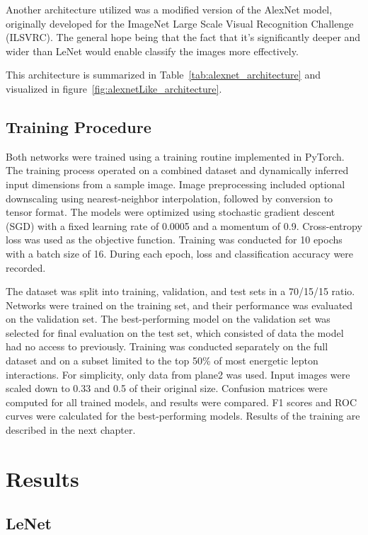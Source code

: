 \documentclass{pracalicmgr}
\begin{document}
Another architecture utilized was a modified version of the AlexNet model, originally developed for the ImageNet Large Scale Visual Recognition Challenge (ILSVRC). The general hope being that the fact that it's significantly deeper and wider than LeNet would enable classify the images more effectively\cite{AlexNETpub}.

This architecture is summarized in Table~\ref{tab:alexnet_architecture} and visualized in figure~\ref{fig:alexnetLike_architecture}.

\subsection{Training Procedure}

Both networks were trained using a training routine implemented in PyTorch. The training process operated on a combined dataset and dynamically inferred input dimensions from a sample image. Image preprocessing included optional downscaling using nearest-neighbor interpolation, followed by conversion to tensor format. The models were optimized using stochastic gradient descent (SGD) with a fixed learning rate of 0.0005 and a momentum of 0.9. Cross-entropy loss was used as the objective function. Training was conducted for 10 epochs with a batch size of 16. During each epoch, loss and classification accuracy were recorded.

The dataset was split into training, validation, and test sets in a 70/15/15 ratio. Networks were trained on the training set, and their performance was evaluated on the validation set. The best-performing model on the validation set was selected for final evaluation on the test set, which consisted of data the model had no access to previously. Training was conducted separately on the full dataset and on a subset limited to the top 50\% of most energetic lepton interactions. For simplicity, only data from plane2 was used. Input images were scaled down to 0.33 and 0.5 of their original size. Confusion matrices were computed for all trained models, and results were compared. F1 scores and ROC curves were calculated for the best-performing models. Results of the training are described in the next chapter.

\section{Results}

\subsection{LeNet}
\end{document}

